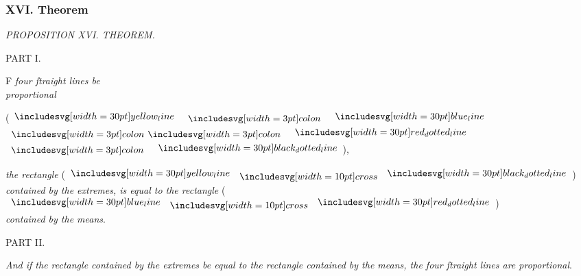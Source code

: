 \documentclass[11pt,preview]{standalone}
\begin{document}
\subsubsection{XVI. Theorem}

\begin{minipage}[t]{0.43\textwidth}
    \vspace{-5pt}
    
\end{minipage}%
\hfill
\begin{minipage}[t]{0.54\textwidth}
    \begin{center}
        \textit{PROPOSITION XVI. THEOREM.}\label{book6pr16} \\
    \end{center}

    \hfill

    \begin{center}
        PART I.\\
        \raggedright \lettrine[lines=3, loversize=1, nindent=0pt]{}{}F \textit{four ſtraight lines be\\ proportional}
    \end{center}
\end{minipage}
\begin{flushright}
    (\hspace{-1ex}$\yellowline$ $\bcolon$ $\blueline$ $\bbcolon$ $\dottedredline$ $\bcolon$ $\dottedblackline$\hspace{-1ex}),
\end{flushright}
\begin{minipage}[t]{0.43\textwidth}
    \phantom{}
\end{minipage}%
\begin{minipage}[t]{0.54\textwidth}
    \raggedright \textit{the rectangle} (\hspace{-1ex}$\yellowline \bcross \dottedblackline$\hspace{-1ex}) \textit{contained by the extremes, is equal to the rectangle} (\hspace{-1ex}$\blueline \bcross \dottedredline$\hspace{-1ex})\\ \textit{contained by the means}.

    \hfill

    \begin{center}
        PART II.\\
        \vspace{1ex}

        \raggedright \textit{And if the rectangle contained by the extremes be equal to the rectangle contained by the means, the four ſtraight lines are proportional}.
    \end{center}
\end{minipage}
\end{document}
